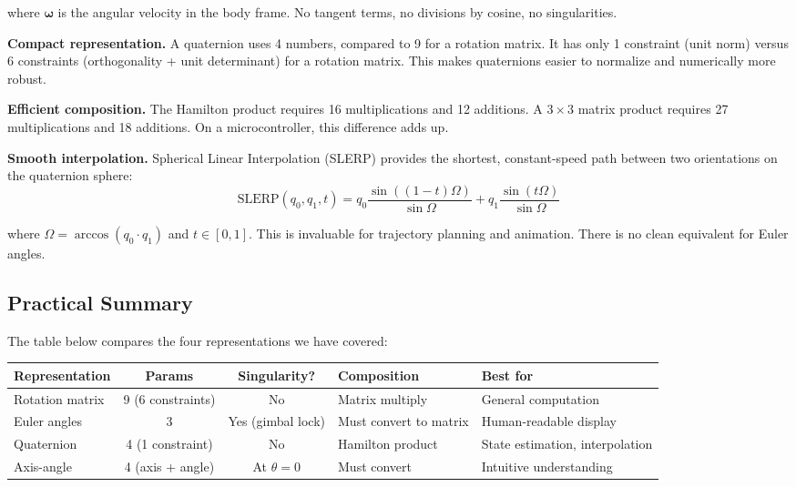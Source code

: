 where $\boldsymbol{\omega}$ is the angular velocity in the body frame. No tangent terms, no divisions by cosine, no singularities.

\textbf{Compact representation.} A quaternion uses 4 numbers, compared to 9 for a rotation matrix. It has only 1 constraint (unit norm) versus 6 constraints (orthogonality + unit determinant) for a rotation matrix. This makes quaternions easier to normalize and numerically more robust.

\textbf{Efficient composition.} The Hamilton product requires 16 multiplications and 12 additions. A $3 \times 3$ matrix product requires 27 multiplications and 18 additions. On a microcontroller, this difference adds up.

\textbf{Smooth interpolation.} Spherical Linear Interpolation (SLERP) provides the shortest, constant-speed path between two orientations on the quaternion sphere:
\begin{equation}
\text{SLERP}(q_0, q_1, t) = q_0 \frac{\sin((1-t)\Omega)}{\sin\Omega} + q_1 \frac{\sin(t\Omega)}{\sin\Omega}
\end{equation}

where $\Omega = \arccos(q_0 \cdot q_1)$ and $t \in [0, 1]$. This is invaluable for trajectory planning and animation. There is no clean equivalent for Euler angles.

\subsection{Practical Summary}

The table below compares the four representations we have covered:

\begin{table}[H]
\centering
\begin{tabular}{@{}lccll@{}}
\toprule
\textbf{Representation} & \textbf{Params} & \textbf{Singularity?} & \textbf{Composition} & \textbf{Best for} \\
\midrule
Rotation matrix & 9 (6 constraints) & No & Matrix multiply & General computation \\
Euler angles & 3 & Yes (gimbal lock) & Must convert to matrix & Human-readable display \\
Quaternion & 4 (1 constraint) & No & Hamilton product & State estimation, interpolation \\
Axis-angle & 4 (axis + angle) & At $\theta = 0$ & Must convert & Intuitive understanding \\
\bottomrule
\end{tabular}
\end{table}

